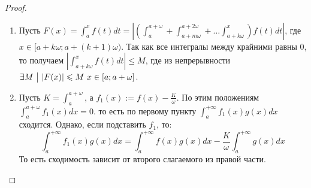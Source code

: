 \begin{proof}
	\begin{enumerate}
		\item Пусть $F(x) = \int_a^xf(t)dt = \left | (\int_a^{a + \omega} + \int_{a +m \omega}^{a + 2\omega} + \ldots \int_{a + k\omega}^x)f(t)dt \right |$, где  $x \in [a + k\omega;a + (k + 1)\omega)$. 
		Так как все интегралы между крайними равны 0, то получаем $\left | \int_{a + k\omega}^xf(t)dt\right | \leq M$, где из непрерывности $\exists M \ \big|\  |F(x)| \leqslant M\ x \in [a;a + \omega]$.
		\item Пусть $K = \int_a^{a + \omega}$, а $f_1(x) := f(x) - \frac{K}{\omega}$. По этим положениям $\int_a^{a + \omega}f_1(x)dx = 0$. то есть по первому пункту $\int_a^{+\infty}f_1(x)g(x)dx$ сходится. Однако, если подставить $f_1$, то:
		\[
			\int_a^{+\infty}f_1(x)g(x)dx = \int_a^{+\infty}f(x)g(x)dx - \frac{K}{\omega}\int_a^{+\infty}g(x)dx
		\]
		То есть сходимость зависит от второго слагаемого из правой части.
	\end{enumerate}
\end{proof}

